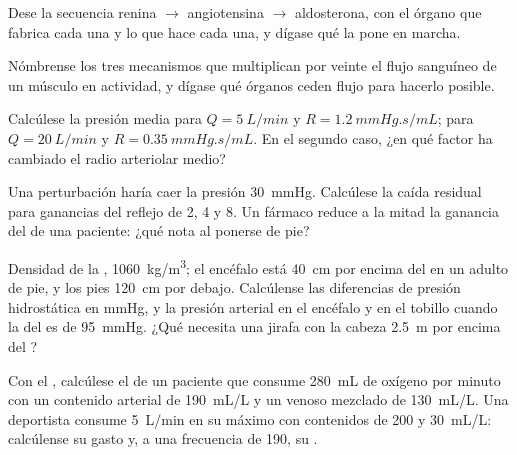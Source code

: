 \begin{exercise}[$\star$]\label{exo:b2:blood-pressure:3}
Dese la secuencia renina $\to$ angiotensina $\to$ aldosterona, con el
órgano que fabrica cada una y lo que hace cada una, y dígase qué la pone
en marcha.
\end{exercise}

\begin{exercise}[$\star$]\label{exo:b2:blood-pressure:4}
Nómbrense los tres mecanismos que multiplican por veinte el flujo
sanguíneo de un músculo en actividad, y dígase qué órganos ceden flujo para
hacerlo posible.
\end{exercise}

\begin{exercise}[$\star\star$]\label{exo:b2:blood-pressure:5}
Calcúlese la presión media para $Q = \qty{5}{L/min}$ y $R =
\qty{1.2}{mmHg.s/mL}$; para $Q = \qty{20}{L/min}$ y $R =
\qty{0.35}{mmHg.s/mL}$. En el segundo caso, ¿en qué factor ha cambiado el
radio arteriolar medio?
\end{exercise}

\begin{exercise}[$\star\star$]\label{exo:b2:blood-pressure:6}
Una perturbación haría caer la presión \qty{30}{mmHg}. Calcúlese la caída
residual para ganancias del reflejo de 2, 4 y 8. Un fármaco reduce a la
mitad la ganancia del  de una paciente: ¿qué nota al ponerse
de pie?
\end{exercise}

\begin{exercise}[$\star\star$]\label{exo:b2:blood-pressure:7}
Densidad de la , \qty{1060}{kg/m^3}; el encéfalo está \qty{40}{cm}
por encima del  en un adulto de pie, y los pies \qty{120}{cm} por
debajo. Calcúlense las diferencias de presión hidrostática en mmHg, y la
presión arterial en el encéfalo y en el tobillo cuando la del  es
de \qty{95}{mmHg}. ¿Qué necesita una jirafa con la cabeza \qty{2.5}{m} por
encima del ?
\end{exercise}

\begin{exercise}[$\star\star$]\label{exo:b2:blood-pressure:8}
Con el , calcúlese el  de un paciente que
consume \qty{280}{mL} de oxígeno por minuto con un contenido arterial de
\qty{190}{mL/L} y un venoso mezclado de \qty{130}{mL/L}. Una deportista
consume \qty{5}{L/min} en su máximo con contenidos de 200 y
\qty{30}{mL/L}: calcúlense su gasto y, a una frecuencia de 190, su .
\end{exercise}

